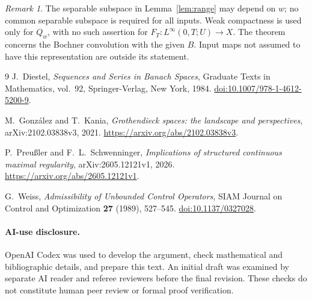 \documentclass[11pt]{article}
\theoremstyle{remark}
\newtheorem{remark}[theorem]{Remark}
\begin{document}
\begin{remark}
The separable subspace in Lemma~\ref{lem:range} may depend on \(w\);
no common separable subspace is required for all inputs.
Weak compactness is used only for \(Q_w\), with no such assertion for
\(F_T:L^\infty(0,T;U)\to X\).
The theorem concerns the Bochner convolution with the given \(B\).
Input maps not assumed to have this representation are outside its statement.
\end{remark}

\begin{thebibliography}{9}
J.~Diestel, \emph{Sequences and Series in Banach Spaces},
Graduate Texts in Mathematics, vol.~92, Springer-Verlag, New York, 1984.
\href{https://doi.org/10.1007/978-1-4612-5200-9}{doi:10.1007/978-1-4612-5200-9}.

M.~Gonz{\'a}lez and T.~Kania,
\emph{Grothendieck spaces: the landscape and perspectives},
arXiv:2102.03838v3, 2021.
\url{https://arxiv.org/abs/2102.03838v3}.

P.~Preu{\ss}ler and F.~L.~Schwenninger,
\emph{Implications of structured continuous maximal regularity},
arXiv:2605.12121v1, 2026.
\url{https://arxiv.org/abs/2605.12121v1}.

G.~Weiss, \emph{Admissibility of Unbounded Control Operators},
SIAM Journal on Control and Optimization \textbf{27} (1989), 527--545.
\href{https://doi.org/10.1137/0327028}{doi:10.1137/0327028}.
\end{thebibliography}

\paragraph{AI-use disclosure.}
OpenAI Codex was used to develop the argument, check mathematical and
bibliographic details, and prepare this text. An initial draft was examined
by separate AI reader and referee reviewers before the final revision.
These checks do not constitute human peer review or formal proof verification.
\end{document}
